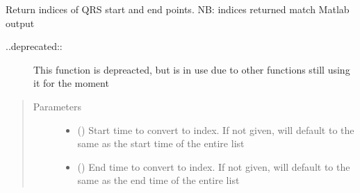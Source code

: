 \documentclass[letterpaper,10pt,english]{sphinxmanual}
\begin{document}
\begin{fulllineitems}
\label{\detokenize{_autosummary/tools.python.deprecated_convert_time_to_index:tools.python.deprecated_convert_time_to_index}}
\sphinxAtStartPar
Return indices of QRS start and end points. NB: indices returned match Matlab output
\begin{description}
\item[{..deprecated::}] \leavevmode
\sphinxAtStartPar
This function is depreacted, but is in use due to other functions still using it for the moment

\end{description}
\begin{quote}\begin{description}
\item[{Parameters}] \leavevmode\begin{itemize}
\item {} 
\sphinxAtStartPar
{} (\sphinxstyleliteralemphasis{\sphinxupquote{, }}) \textendash{} Start time to convert to index. If not given, will default to the same as the start time of the entire list

\item {} 
\sphinxAtStartPar
{} (\sphinxstyleliteralemphasis{\sphinxupquote{, }}) \textendash{} End time to convert to index. If not given, will default to the same as the end time of the entire list


\end{itemize}
\end{description}
\end{quote}
\end{fulllineitems}
\end{document}
